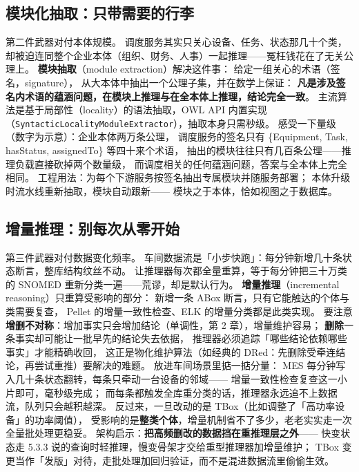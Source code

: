 \subsection{模块化抽取：只带需要的行李}

第二件武器对付本体规模。
调度服务其实只关心设备、任务、状态那几十个类，
却被迫连同整个企业本体（组织、财务、人事）一起推理——冤枉钱花在了无关公理上。
\textbf{模块抽取}（module extraction）解决这件事：
给定一组关心的术语（签名，signature），
从大本体中抽出一个公理子集，并在数学上保证：
\textbf{凡是涉及签名内术语的蕴涵问题，在模块上推理与在全本体上推理，结论完全一致}。
主流算法是基于局部性（locality）的语法抽取，OWL API 内置实现
（\texttt{SyntacticLocalityModuleExtractor}），抽取本身只需秒级。
感受一下量级（数字为示意）：企业本体两万条公理，
调度服务的签名只有 \{Equipment, Task, hasStatus, assignedTo\} 等四十来个术语，
抽出的模块往往只有几百条公理——推理负载直接砍掉两个数量级，
而调度相关的任何蕴涵问题，答案与全本体上完全相同。
工程用法：为每个下游服务按签名抽出专属模块并随服务部署；
本体升级时流水线重新抽取，模块自动跟新——
模块之于本体，恰如视图之于数据库。

\subsection{增量推理：别每次从零开始}

第三件武器对付数据变化频率。
车间数据流是「小步快跑」：每分钟新增几十条状态断言，整库结构纹丝不动。
让推理器每次都全量重算，等于每分钟把三十万类的 SNOMED 重新分类一遍——荒谬，却是默认行为。
\textbf{增量推理}（incremental reasoning）只重算受影响的部分：
新增一条 ABox 断言，只有它能触达的个体与类需要复查，
Pellet 的增量一致性检查、ELK 的增量分类都是此类实现。
要注意\textbf{增删不对称}：增加事实只会增加结论（单调性，第 2 章），增量维护容易；
\textbf{删除}一条事实却可能让一批早先的结论失去依据，
推理器必须追踪「哪些结论依赖哪些事实」才能精确收回，
这正是物化维护算法（如经典的 DRed：先删除受牵连结论，再尝试重推）要解决的难题。
放进车间场景里掂一掂分量：
MES 每分钟写入几十条状态翻转，每条只牵动一台设备的邻域——
增量一致性检查复查这一小片即可，毫秒级完成；
而每条都触发全库重分类的话，推理器永远追不上数据流，队列只会越积越深。
反过来，一旦改动的是 TBox（比如调整了「高功率设备」的功率阈值），
受影响的是\textbf{整类个体}，增量机制省不了多少，老老实实走一次全量批处理更稳妥。
架构启示：\textbf{把高频删改的数据挡在重推理层之外}——
快变状态走 5.3.3 说的查询时轻推理，慢变骨架才交给重型推理器加增量维护；
TBox 变更当作「发版」对待，走批处理加回归验证，而不是混进数据流里偷偷生效。

